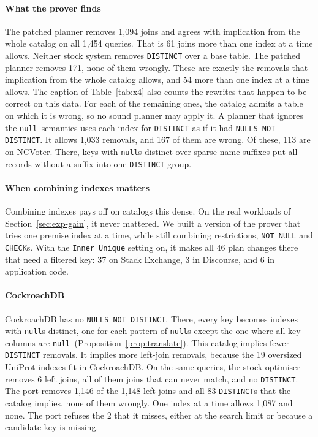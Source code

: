 \documentclass[conference]{IEEEtran}
\theoremstyle{definition}
\newcommand{\sql}[1]{\texttt{#1}}
\newcommand{\nul}{\texttt{null}}
\newif\ifextended
\begin{document}
\paragraph*{What the prover finds} The patched planner removes 1{,}094 joins and agrees with implication from the whole
catalog on all 1{,}454 queries. That is 61 joins more than one index at a time allows. Neither stock system removes
\sql{DISTINCT} over a base table. The patched planner removes 171, none of them wrongly. These are exactly the removals
that implication from the whole catalog allows, and 54 more than one index at a time allows. The caption of Table~\ref{tab:x4}
also counts the rewrites that happen to be correct on this data. For each of the remaining ones, the catalog admits a
table on which it is wrong, so no sound planner may apply it. A planner that ignores the \nul\ semantics uses each index for \sql{DISTINCT} as
if it had \sql{NULLS NOT DISTINCT}. It allows 1{,}033 removals, and 167 of them are wrong. Of these, 113 are on NCVoter.
There, keys with \nul s distinct over sparse name suffixes put all records without a suffix into one \sql{DISTINCT}
group.

\paragraph*{When combining indexes matters} Combining indexes pays off on catalogs this dense. On the real workloads of
Section~\ref{sec:exp-gain}, it never mattered. We built a version of the prover that tries one premise index at a time,
while still combining restrictions, \sql{NOT NULL} and \sql{CHECK}s. With the \sql{Inner Unique} setting on, it makes
all 46 plan changes there that need a filtered key: 37 on Stack Exchange, 3 in Discourse, and 6 in application code.

\ifextended
\paragraph*{CockroachDB} CockroachDB has no \sql{NULLS NOT DISTINCT}. There, every key becomes indexes with \nul s
distinct, one for each pattern of \nul s except the one where all key columns are \nul\
(Proposition~\ref{prop:translate}). This catalog implies fewer \sql{DISTINCT} removals. It implies more left-join
removals, because the 19 oversized UniProt indexes fit in CockroachDB. On the same queries, the stock optimiser removes 6
left joins, all of them joins that can never match, and no \sql{DISTINCT}. The port removes 1{,}146 of the 1{,}148 left
joins and all 83 \sql{DISTINCT}s that the catalog implies, none of them wrongly. One index at a time allows 1{,}087 and
none. The port refuses the 2 that it misses, either at the search limit or because a candidate key is missing.
\end{document}
